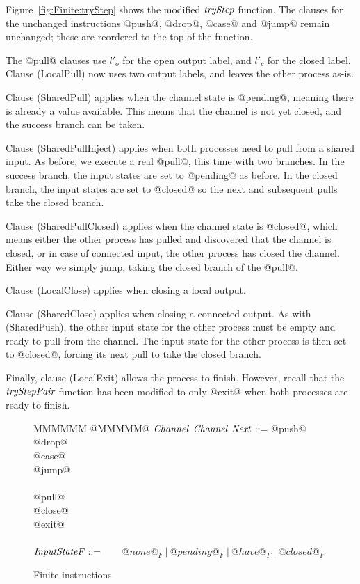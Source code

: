 Figure~\ref{fig:Finite:tryStep} shows the modified $\textit{tryStep}$ function.
The clauses for the unchanged instructions @push@, @drop@, @case@ and @jump@ remain unchanged; these are reordered to the top of the function.

The @pull@ clauses use $l'_o$ for the open output label, and $l'_c$ for the closed label.
Clause (LocalPull) now uses two output labels, and leaves the other process as-is.

Clause (SharedPull) applies when the channel state is @pending@, meaning there is already a value available. This means that the channel is not yet closed, and the success branch can be taken.

Clause (SharedPullInject) applies when both processes need to pull from a shared input. As before, we execute a real @pull@, this time with two branches. In the success branch, the input states are set to @pending@ as before. In the closed branch, the input states are set to @closed@ so the next and subsequent pulls take the closed branch.

Clause (SharedPullClosed) applies when the channel state is @closed@, which means either the other process has pulled and discovered that the channel is closed, or in case of connected input, the other process has closed the channel. Either way we simply jump, taking the closed branch of the @pull@.

Clause (LocalClose) applies when closing a local output.

Clause (SharedClose) applies when closing a connected output. As with (SharedPush), the other input state for the other process must be empty and ready to pull from the channel. The input state for the other process is then set to @closed@, forcing its next pull to take the closed branch.

Finally, clause (LocalExit) allows the process to finish. However, recall that the $\textit{tryStepPair}$ function has been modified to only @exit@ when both processes are ready to finish.


\begin{figure}
\begin{tabbing}
MMMMMM \TABDEF @MMMMM@  \TABSKIP $\textit{Channel}$ \TABSKIP $\textit{Channel}$ \TABSKIP $\textit{Next}$ \TABSKIP \kill
\Instr
    \> ::=\> @push@  \> \Chan  \> \Exp  \> \Next \\
    \TABALT  @drop@  \> \Chan  \>       \> \Next \\
    \TABALT  @case@  \> \Exp   \> \Next \> \Next \\
    \TABALT  @jump@  \>        \>       \> \Next \\
    \\
    \TABALT  @pull@  \> \Chan  \> \Var  \> \Next \> \Next \\
    \TABALT  @close@ \> \Chan  \>       \> \Next \\
    \TABALT  @exit@ 
\\
\\
$\textit{InputStateF}$ \> ::=  \> ~~~ $@none@_F ~|~ @pending@_F ~|~ @have@_F ~|~ @closed@_F$
\end{tabbing}
\caption{Finite instructions}
\label{fig:Finite:Instr}
\end{figure}


